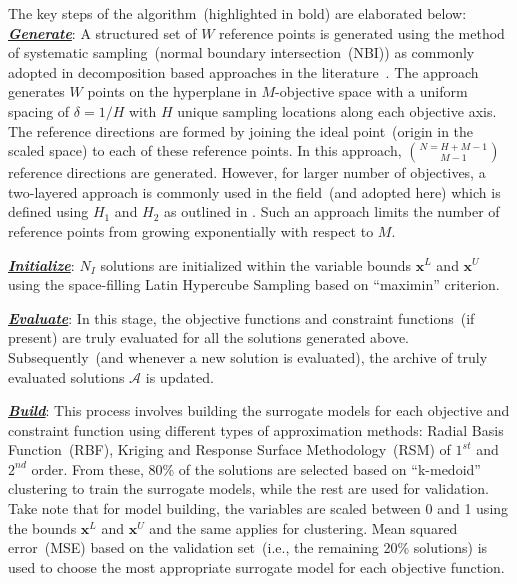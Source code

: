 \documentclass[twocolumn,10pt]{asme2ej}
\begin{document}
The key steps of the algorithm~(highlighted in bold) are elaborated below:\\

\noindent \underline{\it \textbf{Generate}}: A structured set of $W$ reference points is generated using the method of systematic sampling~(normal boundary intersection~(NBI)) as commonly adopted in decomposition based approaches in the literature~\cite{KHTdas1998normal,KHTjmd2017,KHTtrivedisurvey}. The approach generates $W$ points on the hyperplane in $M$-objective space with a uniform spacing of $\delta=1/H$ with $H$ unique sampling locations along each objective axis. The reference directions are formed by joining the ideal point~(origin in the scaled space) to each of these reference points. In this approach, $N = {H+M-1}\choose{M-1}$ reference directions are generated. However, for larger number of objectives, a two-layered approach is commonly used in the field~(and adopted here) which is defined using $H_1$ and $H_2$ as outlined in \cite{KHTLi2015dominance}. Such an approach limits the number of reference points from growing exponentially with respect to $M$.

	\noindent \underline{\it \textbf{Initialize}}: $N_I$ solutions are initialized within the variable bounds $\textbf{x}^{L}$ and $\textbf{x}^{U}$ using the space-filling Latin Hypercube Sampling based on ``maximin'' criterion.
	
	\noindent \underline{\it \textbf{Evaluate}}: In this stage, the objective functions and constraint functions~(if present) are truly evaluated for all the solutions generated above. {\color{blue}Subsequently~(and whenever a new solution is evaluated)}, the archive of truly evaluated solutions $\mathcal{A}$ is updated. 
	
	
	\noindent \underline{\it \textbf{Build}}: This process involves building the surrogate models for each objective and constraint function using different types of approximation methods: Radial Basis Function~(RBF), Kriging and Response Surface Methodology~(RSM) of $1^{st}$ and $2^{nd}$ order. From these, 80\% of the solutions are selected based on ``k-medoid'' clustering to train the surrogate models, while the rest are used for validation. Take note that for model building, the variables are scaled between 0 and 1 using the bounds $\textbf{x}^{L}$ and $\textbf{x}^{U}$ and the same applies for clustering. Mean squared error~(MSE) based on the validation set~(i.e., the remaining 20\% solutions) is used to choose the most appropriate surrogate model for each objective function. 
	
\end{document}
